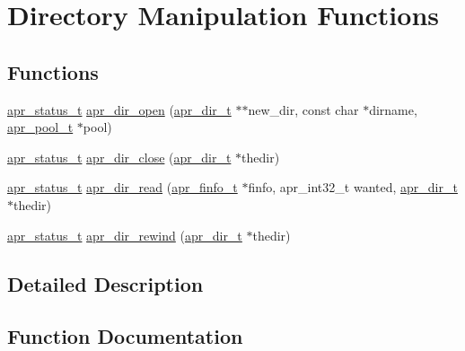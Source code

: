 \hypertarget{group__apr__dir}{}\section{Directory Manipulation Functions}
\label{group__apr__dir}
\subsection*{Functions}
\begin{DoxyCompactItemize}
\item 
\hyperlink{group__apr__errno_gaf76ee4543247e9fb3f3546203e590a6c}{apr\+\_\+status\+\_\+t} \hyperlink{group__apr__dir_ga796002db3e3c7b7c9d5632efbcd4329c}{apr\+\_\+dir\+\_\+open} (\hyperlink{group__apr__file__info_ga92ed8cf52cba2abb42cf74087aa74da8}{apr\+\_\+dir\+\_\+t} $\ast$$\ast$new\+\_\+dir, const char $\ast$dirname, \hyperlink{group__apr__pools_gaf137f28edcf9a086cd6bc36c20d7cdfb}{apr\+\_\+pool\+\_\+t} $\ast$pool)
\item 
\hyperlink{group__apr__errno_gaf76ee4543247e9fb3f3546203e590a6c}{apr\+\_\+status\+\_\+t} \hyperlink{group__apr__dir_ga57fef00ccea03e9244f6fa21da4d3359}{apr\+\_\+dir\+\_\+close} (\hyperlink{group__apr__file__info_ga92ed8cf52cba2abb42cf74087aa74da8}{apr\+\_\+dir\+\_\+t} $\ast$thedir)
\item 
\hyperlink{group__apr__errno_gaf76ee4543247e9fb3f3546203e590a6c}{apr\+\_\+status\+\_\+t} \hyperlink{group__apr__dir_ga3e4ee253e0c712160bee10bfb9c8e4a8}{apr\+\_\+dir\+\_\+read} (\hyperlink{structapr__finfo__t}{apr\+\_\+finfo\+\_\+t} $\ast$finfo, apr\+\_\+int32\+\_\+t wanted, \hyperlink{group__apr__file__info_ga92ed8cf52cba2abb42cf74087aa74da8}{apr\+\_\+dir\+\_\+t} $\ast$thedir)
\item 
\hyperlink{group__apr__errno_gaf76ee4543247e9fb3f3546203e590a6c}{apr\+\_\+status\+\_\+t} \hyperlink{group__apr__dir_gab9b9f23e76128144d3fb953cabea6290}{apr\+\_\+dir\+\_\+rewind} (\hyperlink{group__apr__file__info_ga92ed8cf52cba2abb42cf74087aa74da8}{apr\+\_\+dir\+\_\+t} $\ast$thedir)
\end{DoxyCompactItemize}


\subsection{Detailed Description}


\subsection{Function Documentation}
